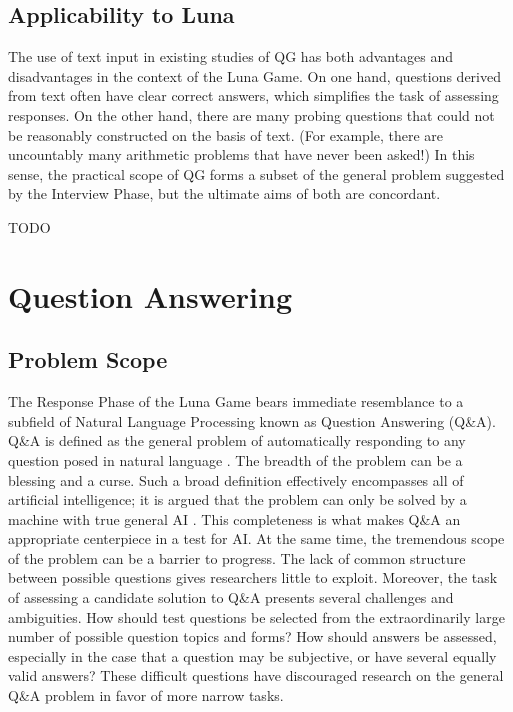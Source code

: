 \subsection{Applicability to Luna}

The use of text input in existing studies of QG has both advantages and disadvantages in the context of the Luna Game. On one hand, questions derived from text often have clear correct answers, which simplifies the task of assessing responses. On the other hand, there are many probing questions that could not be reasonably constructed on the basis of text. (For example, there are uncountably many arithmetic problems that have never been asked!) In this sense, the practical scope of QG forms a subset of the general problem suggested by the Interview Phase, but the ultimate aims of both are concordant. 

TODO


\section{Question Answering}

\subsection{Problem Scope}


The Response Phase of the Luna Game bears immediate resemblance to a subfield of Natural Language Processing known as Question Answering (Q\&A). Q\&A is defined as the general problem of automatically responding to any question posed in natural language \citep{andrenucci2005automated, hirschman2001natural}. The breadth of the problem can be a blessing and a curse. Such a broad definition effectively encompasses all of artificial intelligence; it is argued that the problem can only be solved by a machine with true general AI \citep{yampolskiy2013turing}. This completeness is what makes Q\&A an appropriate centerpiece in a test for AI. At the same time, the tremendous scope of the problem can be a barrier to progress. The lack of common structure between possible questions gives researchers little to exploit. Moreover, the task of assessing a candidate solution to Q\&A presents several challenges and ambiguities. How should test questions be selected from the extraordinarily large number of possible question topics and forms? How should answers be assessed, especially in the case that a question may be subjective, or have several equally valid answers? These difficult questions have discouraged research on the general Q\&A problem in favor of more narrow tasks.

